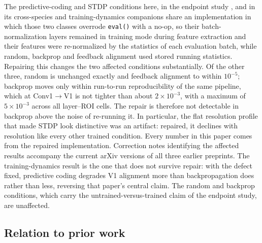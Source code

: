 \documentclass[10pt,twocolumn]{article}
\begin{document}
The predictive-coding and STDP conditions here, in the endpoint study \citep{leutenegger2026}, and in its cross-species and training-dynamics companions share an implementation in which those two classes overrode \texttt{eval()} with a no-op, so their batch-normalization layers remained in training mode during feature extraction and their features were re-normalized by the statistics of each evaluation batch, while random, backprop and feedback alignment used stored running statistics. Repairing this changes the two affected conditions substantially. Of the other three, random is unchanged exactly and feedback alignment to within $10^{-5}$; backprop moves only within run-to-run reproducibility of the same pipeline, which at Conv1$\to$V1 is not tighter than about $2\times10^{-3}$, with a maximum of $5\times10^{-3}$ across all layer--ROI cells. The repair is therefore not detectable in backprop above the noise of re-running it. In particular, the flat resolution profile that made STDP look distinctive was an artifact: repaired, it declines with resolution like every other trained condition. Every number in this paper comes from the repaired implementation. Correction notes identifying the affected results accompany the current arXiv versions of all three earlier preprints. The training-dynamics result is the one that does not survive repair: with the defect fixed, predictive coding degrades V1 alignment more than backpropagation does rather than less, reversing that paper's central claim. The random and backprop conditions, which carry the untrained-versus-trained claim of the endpoint study, are unaffected.

\subsection{Relation to prior work}
\end{document}
